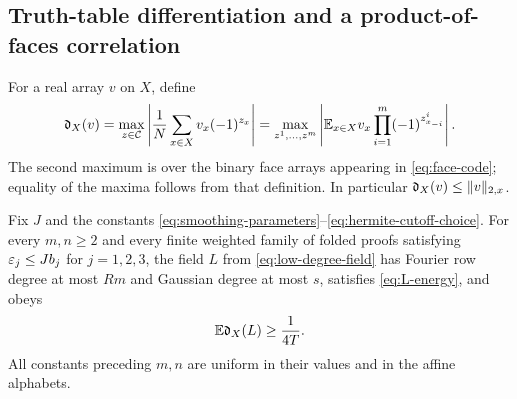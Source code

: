 \subsection{Truth-table differentiation and a product-of-faces correlation}

For a real array $v$ on $X$, define
\begin{equation}\label{eq:face-correlation}
 \mathfrak d_X(v)
 =\max_{z\in\mathcal C}\left|\frac1N\sum_{x\in X}v_x(-1)^{z_x}\right|
 =\max_{z^1,\ldots,z^m}
 \left|\mathbb E_{x\in X}v_x\prod_{i=1}^m(-1)^{z^i_{x_{-i}}}\right|.
\end{equation}
The second maximum is over the binary face arrays appearing in
\eqref{eq:face-code}; equality of the maxima follows from that definition.
In particular $\mathfrak d_X(v)\le\lVert v\rVert_{2,x}$.

\begin{proposition}\label{prop:correlation}
Fix $J$ and the constants
\eqref{eq:smoothing-parameters}--\eqref{eq:hermite-cutoff-choice}.
For every $m,n\ge2$ and every finite weighted family of folded proofs
satisfying $\varepsilon_j\le Jb_j$ for $j=1,2,3$, the field $L$ from
\eqref{eq:low-degree-field} has Fourier row degree at most $Rm$ and
Gaussian degree at most $s$, satisfies \eqref{eq:L-energy}, and obeys
\begin{equation}\label{eq:correlation-lower}
 \mathbb E\mathfrak d_X(L)\ge\frac1{4T}.
\end{equation}
All constants preceding $m,n$ are uniform in their values and in the
affine alphabets.
\end{proposition}
